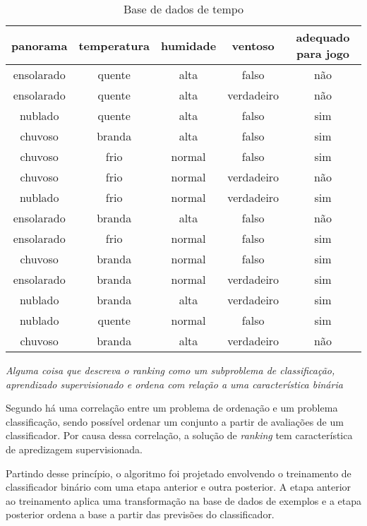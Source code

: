 \begin{table}[h!]
    \centering
    \begin{tabular}{ccccc}
        \hline
        panorama & temperatura & humidade & ventoso & adequado para jogo \\
        \hline
        ensolarado & quente & alta & falso & não \\
        ensolarado & quente & alta & verdadeiro & não \\
        nublado & quente & alta & falso & sim \\
        chuvoso & branda & alta & falso & sim \\
        chuvoso & frio & normal & falso & sim \\
        chuvoso & frio & normal & verdadeiro & não \\
        nublado & frio & normal & verdadeiro & sim \\
        ensolarado & branda & alta & falso & não \\
        ensolarado & frio & normal & falso & sim \\
        chuvoso & branda & normal & falso & sim \\
        ensolarado & branda & normal & verdadeiro & sim \\
        nublado & branda & alta & verdadeiro & sim \\
        nublado & quente & normal & falso & sim \\
        chuvoso & branda & alta & verdadeiro & não \\
        \hline
    \end{tabular}

    \caption{Base de dados de tempo}
\end{table}






\emph{Alguma coisa que descreva o ranking como um subproblema de classificação, aprendizado supervisionado e ordena com relação a uma característica binária}

Segundo \cite{langford08} há uma correlação entre um problema de ordenação e um problema classificação, sendo possível ordenar um conjunto a partir de avaliações de um classificador. Por causa dessa correlação, a solução de \emph{ranking} tem característica de apredizagem supervisionada.

Partindo desse princípio, o algoritmo foi projetado envolvendo o treinamento de classificador binário com uma etapa anterior e outra posterior. A etapa anterior ao treinamento aplica uma transformação na base de dados de exemplos e a etapa posterior  ordena a base a partir das previsões do classificador.

